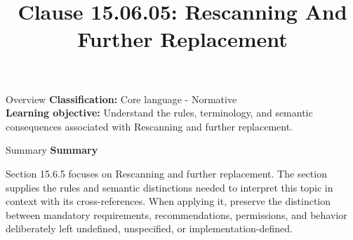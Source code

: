 \documentclass[10pt,letterpaper]{article}
\title{Clause 15.06.05: Rescanning And Further Replacement}
\author{}
\date{}
\begin{document}
\maketitle
\begin{CornellOverviewBox}{Overview}
\textbf{Classification:} Core language - Normative\\[2pt]
\textbf{Learning objective:} Understand the rules, terminology, and semantic consequences associated with Rescanning and further replacement.
\end{CornellOverviewBox}\begin{CornellSummaryBox}{Summary}
{\sffamily\bfseries\color{Accent} Summary}\par\vspace{3pt}Section 15.6.5 focuses on Rescanning and further replacement. The section supplies the rules and semantic distinctions needed to interpret this topic in context with its cross-references. When applying it, preserve the distinction between mandatory requirements, recommendations, permissions, and behavior deliberately left undefined, unspecified, or implementation-defined.
\end{CornellSummaryBox}
\end{document}
